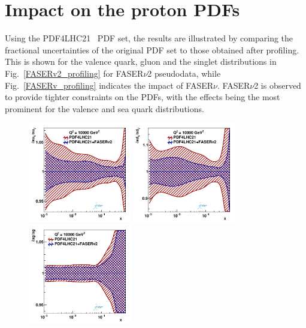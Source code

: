 \clearpage
\section{Impact on the proton PDFs}
\label{sec:protonPDFs}

Using the PDF4LHC21~\cite{PDF4LHCWorkingGroup:2022cjn} PDF set, the results are illustrated by comparing the fractional uncertainties of the original PDF set to those obtained after profiling. 
This is shown for the valence quark, gluon and the singlet distributions in Fig.~\ref{FASERv2_profiling} for FASER$\nu$2 pseudodata, while Fig.~\ref{FASERv_profiling} indicates the impact of FASER$\nu$. FASER$\nu$2 is observed to provide tighter constraints on the PDFs, with the effects being the most prominent for the valence and sea quark distributions.

\begin{figure}[H]
\centering
\includegraphics[width=0.4\textwidth]{./figs_xFitter/FASERv2_q2_10000_pdf_uv_ratio.pdf}
\includegraphics[width=0.4\textwidth]{./figs_xFitter/FASERv2_q2_10000_pdf_dv_ratio.pdf}\\
\includegraphics[width=0.4\textwidth]{./figs_xFitter/FASERv2_q2_10000_pdf_g_ratio.pdf}

\end{figure}
